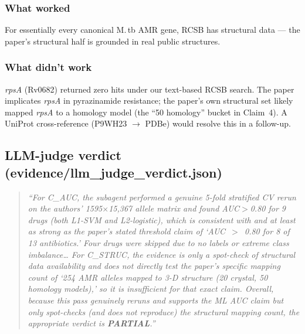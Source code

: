 \documentclass[11pt,letterpaper]{article}
\begin{document}
\subsubsection*{What worked}
For essentially every canonical M.\,tb AMR gene, RCSB has structural data
--- the paper's structural half is grounded in real public structures.

\subsubsection*{What didn't work}
\emph{rpsA} (Rv0682) returned zero hits under our text-based RCSB search.
The paper implicates \emph{rpsA} in pyrazinamide resistance; the paper's
own structural set likely mapped \emph{rpsA} to a homology model
(the ``50 homology'' bucket in Claim~4). A UniProt cross-reference
(P9WH23 \(\to\) PDBe) would resolve this in a follow-up.

\subsection{LLM-judge verdict (evidence/llm\_judge\_verdict.json)}
\begin{quote}
\textit{``For C\_AUC, the subagent performed a genuine 5-fold stratified CV
rerun on the authors' 1595\(\times\)15,367 allele matrix and found AUC$>$0.80
for 9 drugs (both L1-SVM and L2-logistic), which is consistent with and at
least as strong as the paper's stated threshold claim of `AUC~$>$~0.80 for
8 of 13 antibiotics.' Four drugs were skipped due to no labels or extreme
class imbalance\ldots{} For C\_STRUC, the evidence is only a spot-check of
structural data availability and does not directly test the paper's specific
mapping count of `254 AMR alleles mapped to 3-D structure (20 crystal, 50
homology models),' so it is insufficient for that exact claim. Overall,
because this pass genuinely reruns and supports the ML AUC claim but only
spot-checks (and does not reproduce) the structural mapping count, the
appropriate verdict is \textbf{PARTIAL}.''}
\end{quote}
\end{document}
